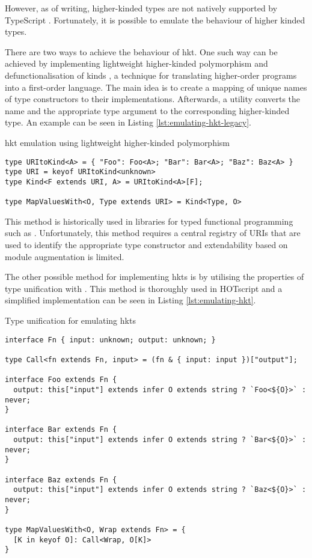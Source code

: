 However, as of writing, higher-kinded types are not natively supported by TypeScript \cite{DocumentationTypeScriptFunctional}. Fortunately, it is possible to emulate the behaviour of higher kinded types.

There are two ways to achieve the behaviour of \acrshort{hkt}. One such way can be achieved by implementing lightweight higher-kinded polymorphism \cite{yallopLightweightHigherKindedPolymorphism2014} and defunctionalisation of kinds \cite{reynoldsDefinitionalInterpretersHigherorder1972}, a technique for translating higher-order programs into a first-order language. The main idea is to create a mapping of unique names of type constructors to their implementations. Afterwards, a  utility converts the name and the appropriate type argument to the corresponding higher-kinded type. An example can be seen in Listing \ref{lst:emulating-hkt-legacy}. 

\begin{listing}[ht]
  \caption{\acrshort{hkt} emulation using lightweight higher-kinded polymorphism}\label{lst:emulating-hkt-legacy}
  \begin{verbatim}
type URItoKind<A> = { "Foo": Foo<A>; "Bar": Bar<A>; "Baz": Baz<A> }
type URI = keyof URItoKind<unknown>
type Kind<F extends URI, A> = URItoKind<A>[F];

type MapValuesWith<O, Type extends URI> = Kind<Type, O>
\end{verbatim}
\end{listing}

This method is historically used in libraries for typed functional programming such as  \cite{GcantiFptsFunctional}. Unfortunately, this method requires a central registry of URIs that are used to identify the appropriate type constructor and extendability based on module augmentation is limited.

The other possible method for implementing \acrshort{hkt}s is by utilising the properties of type unification with . This method is thoroughly used in HOTscript \cite{vergnaudHigherOrderTypeScriptHOTScript2023} and a simplified implementation can be seen in Listing \ref{lst:emulating-hkt}.

\begin{listing}[ht]
  \caption{Type unification for emulating \acrshort{hkt}s}\label{lst:emulating-hkt}
  \begin{verbatim}
interface Fn { input: unknown; output: unknown; }

type Call<fn extends Fn, input> = (fn & { input: input })["output"];

interface Foo extends Fn {
  output: this["input"] extends infer O extends string ? `Foo<${O}>` : never;
}

interface Bar extends Fn {
  output: this["input"] extends infer O extends string ? `Bar<${O}>` : never;
}

interface Baz extends Fn {
  output: this["input"] extends infer O extends string ? `Baz<${O}>` : never;
}

type MapValuesWith<O, Wrap extends Fn> = {
  [K in keyof O]: Call<Wrap, O[K]>
}
\end{verbatim}
\end{listing}


